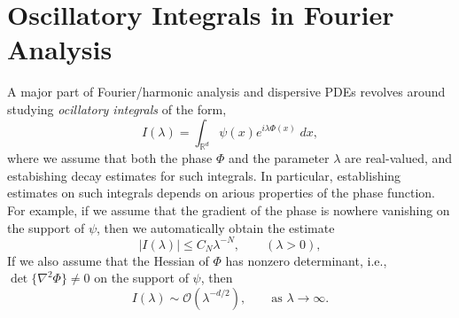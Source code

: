 \documentclass{article}
\begin{document}
	\section{Oscillatory Integrals in Fourier Analysis} 
	A major part of Fourier/harmonic analysis and dispersive PDEs revolves around studying \textit{ocillatory integrals} of the form, 
	\begin{equation*}
		I(\lambda) = \int_{\mathbb{R}^{d}}\psi(x)e^{i\lambda\Phi(x)}\;dx, 
	\end{equation*}
	where we assume that both the phase $\Phi$ and the parameter $\lambda$ are real-valued, and estabishing decay estimates for such integrals. In particular, establishing estimates on such integrals depends on arious properties of the phase function. For example, if we assume that the gradient of the phase is nowhere vanishing on the support of $\psi$, then we automatically obtain the estimate 
	\begin{equation*}
		|I(\lambda)| \leq C_{N}\lambda^{-N}, \qquad (\lambda > 0), 
	\end{equation*} 
	If we also assume that the Hessian of $\Phi$ has nonzero determinant, i.e., $\det\{\nabla^{2}\Phi\}\neq 0$ on the support of $\psi$, then 
	\begin{equation*}
		I(\lambda) \sim \mathcal{O}(\lambda^{-d/2}), \qquad \text{as $\lambda\to \infty$}. 
	\end{equation*}
\end{document}
